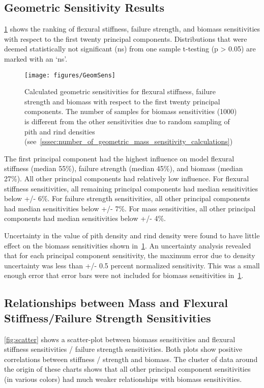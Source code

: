 \subsection{Geometric Sensitivity Results}
\label{ssec:geometric_sensitivity_results}
\cref{fig:GeomSens} shows the ranking of flexural stiffness, failure strength, and biomass sensitivities with respect to the first twenty principal components. Distributions that were deemed statistically not significant (ns) from one sample t-testing (p > 0.05) are marked with an ‘ns’.

\begin{figure}[htbp]
	\centering
	\texttt{[image: figures/GeomSens]}
	\caption[Calculated geometric sensitivities for flexural stiffness, failure strength and biomass with respect to the first twenty principal components.]{Calculated geometric sensitivities for flexural stiffness, failure strength and biomass with respect to the first twenty principal components. The number of samples for biomass sensitivities (1000) is different from the other sensitivities due to random sampling of pith and rind densities (see~\cref{sssec:number_of_geometric_mass_sensitivity_calculations})}
	\label{fig:GeomSens}
\end{figure}

The first principal component had the highest influence on model flexural stiffness (median 55\%), failure strength (median 45\%), and biomass (median 27\%). All other principal components had relatively low influence. For flexural stiffness sensitivities, all remaining principal components had median sensitivities below +/- 6\%. For failure strength sensitivities, all other principal components had median sensitivities below +/- 7\%. For mass sensitivities, all other principal components had median sensitivities below +/- 4\%.

Uncertainty in the value of pith density and rind density were found to have little effect on the biomass sensitivities shown in~\cref{fig:GeomSens}. An uncertainty analysis revealed that for each principal component sensitivity, the maximum error due to density uncertainty was less than +/- 0.5 percent normalized sensitivity. This was a small enough error that error bars were not included for biomass sensitivities in~\cref{fig:GeomSens}.

\subsection{Relationships between Mass and Flexural Stiffness/Failure Strength Sensitivities}
\label{ssec:relationships_between_mass_and_flexural_stiffness_failure_strength_sensitivities}
\cref{fig:scatter} shows a scatter-plot between biomass sensitivities and flexural stiffness sensitivities / failure strength sensitivities. Both plots show positive correlations between stiffness / strength and biomass. The cluster of data around the origin of these charts shows that all other principal component sensitivities (in various colors) had much weaker relationships with biomass sensitivities.

